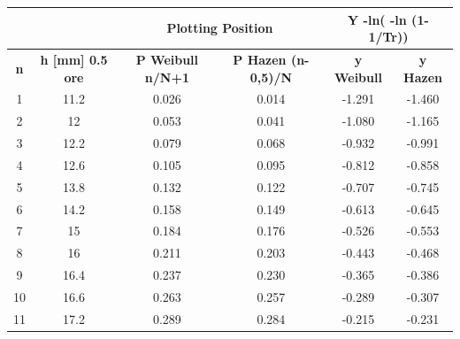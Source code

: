 \begin{table}[H] \centering
    \begin{tabular}{cccccc}
 &  & \multicolumn{2}{c}{\textbf{Plotting Position}} & \multicolumn{2}{c}{\textbf{Y -ln( -ln (1- 1/Tr))}}\\
 \toprule
    \textbf{n} & \textbf{h [mm] 0.5 ore} & \textbf{P Weibull   n/N+1} & \textbf{P Hazen  (n-0,5)/N} & \textbf{y Weibull} & \textbf{y Hazen}\\
\midrule
    1          & 11.2                        & 0.026                      & 0.014                       & -1.291                  & -1.460                  \\
    2          & 12                          & 0.053                      & 0.041                       & -1.080                  & -1.165                  \\
    3          & 12.2                        & 0.079                      & 0.068                       & -0.932                  & -0.991                  \\
    4          & 12.6                        & 0.105                      & 0.095                       & -0.812                  & -0.858                  \\
    5          & 13.8                        & 0.132                      & 0.122                       & -0.707                  & -0.745                  \\
    6          & 14.2                        & 0.158                      & 0.149                       & -0.613                  & -0.645                  \\
    7          & 15                          & 0.184                      & 0.176                       & -0.526                  & -0.553                  \\
    8          & 16                          & 0.211                      & 0.203                       & -0.443                  & -0.468                  \\
    9          & 16.4                        & 0.237                      & 0.230                       & -0.365                  & -0.386                  \\
    10         & 16.6                        & 0.263                      & 0.257                       & -0.289                  & -0.307                  \\
    11         & 17.2                        & 0.289                      & 0.284                       & -0.215                  & -0.231                  \\

\end{tabular}
\end{table}
